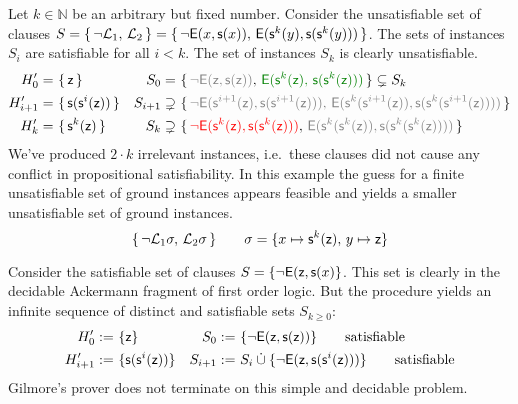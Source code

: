 %

\begin{example}\label{ex:unsat:nexsx}
	Let \( k\in\mathbb{N} \) be an arbitrary but fixed number.
	Consider the unsatisfiable set of clauses
	\(
		S = \{ \, \lnot\mathcal{L}_1, \, \mathcal{L}_2 \, \} =
		 \{ \,
		{ \lnot\mathsf{E}(x, \mathsf{s}(x)) }, \,
		{ \mathsf{E}(\mathsf{s}^{k}(y), \mathsf{s}(\mathsf{s}^{k}(y)))}
		 \, \}
	 \).
	The sets of instances \( S_{i} \) are satisfiable for all \( i<k \).
	The set of instances \( S_{k} \) is clearly unsatisfiable.
	\begin{align*}
	H'_{0} =&{\ } \{ \, \mzero{} \, \}
	&
	S_{0} =&{\ } \{ \,
	{\colG \lnot\mE(\mzero,\msucc(\mzero))}, \,
	{\colHi \mE(\msucc^k(\mzero), \, \msucc(\msucc^k(\mzero)))}
	 \, \}
	\subsetneq S_k
	\\
	H'_{i+1} =&{\ } \{ \, \msucc(\msucc^{i}(\mzero)) \, \}
	&
	S_{i+1} \supsetneq&\
	 \{ \,
	{\colG \lnot\mE(\msucc^{i+1}(\mzero),\msucc(\msucc^{i+1}(\mzero))), \,
		\mE(\msucc^k(\msucc^{i+1}(\mzero)), \msucc(\msucc^k(\msucc^{i+1}(\mzero))))}
	 \, \}
	\\
	H'_{k} =&{\ } \{ \, \msucc^{k}(\mzero) \, \}
	&
	S_{k} \supsetneq&\
	 \{ \,
	{\colLo \lnot\mE(\msucc^{k}(\mzero),\msucc(\msucc^{k}(\mzero)))}, \,
	{\colG\mE(\msucc^k(\msucc^{k}(\mzero)), \msucc(\msucc^k(\msucc^{k}(\mzero))))}
	 \, \}
	\end{align*}
	We've produced \( 2\cdot k \)
	{ irrelevant} instances,
	i.e.~these clauses did not cause any conflict in
	propositional satisfiability.
	In this example the guess for a finite unsatisfiable set of ground instances appears feasible and yields a smaller unsatisfiable set of ground instances.
	\[
	 \{ \,
	\lnot\mathcal{L}_1\sigma, \, \mathcal{L}_2\sigma
	 \, \} \qquad \sigma= \{ x\mapsto \mathsf{s}^k(\mathsf{z}), \, y\mapsto \mathsf{z} \}
	\]
\end{example}

\begin{example}\label{ex:sat:exy}
	Consider the satisfiable set of clauses
	\( S = \{ \lnot\mathsf{E}(\mathsf{z},\mathsf{s}(x)\} \).
	This set is clearly in the decidable Ackermann fragment of first order logic.
	But the procedure yields an infinite sequence of distinct and satisfiable sets \( S_{k\geq0} \):
	\begin{align*}
	H'_{0} :=&{\ } \{ \mathsf{z} \}
	&
	S_{0} :=&{\ } \{ \lnot\mathsf{E}(\mathsf{z},\mathsf{s}(\mathsf{z}))
	\}
	\tag*{satisfiable}
	\\
	H'_{i+1} :=&{\ } \{ \mathsf{s}(\mathsf{s}^{i}(\mathsf{z})) \}
	&
	S_{i+1} :=&{\ }S_i \mathbin{\dot\cup}
	 \{
	\lnot\mathsf{E}(\mathsf{z},\mathsf{s}(\mathsf{s}^i(\mathsf{z})))
	\}
	\tag*{satisfiable}
	\end{align*}
	Gilmore's prover does not terminate on this simple and decidable problem.
\end{example}



